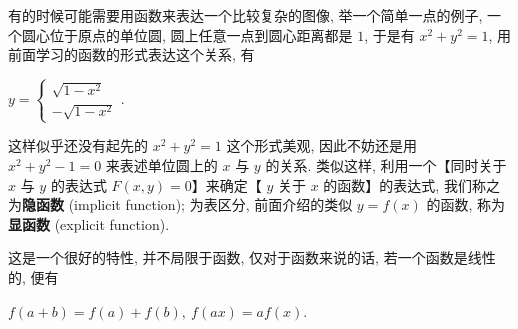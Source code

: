 \begin{tcolorbox}[size=fbox, breakable, enhanced jigsaw, title={隐函数 (implicit
function)}]

有的时候可能需要用函数来表达一个比较复杂的图像, 举一个简单一点的例子,
一个圆心位于原点的单位圆, 圆上任意一点到圆心距离都是 $1$, 于是有
$x^2+y^2=1$, 用前面学习的函数的形式表达这个关系, 有

$y=\begin{cases}\sqrt{1-x^2}\\-\sqrt{1-x^2}\end{cases}.$

这样似乎还没有起先的 $x^2+y^2=1$ 这个形式美观, 因此不妨还是用
$x^2+y^2-1=0$ 来表述单位圆上的 $x$ 与 $y$ 的关系. 类似这样,
利用一个【同时关于 $x$ 与 $y$ 的表达式 $F(x,y)=0$】来确定【 $y$
关于 $x$ 的函数】的表达式, 我们称之为\textbf{隐函数} (implicit
function); 为表区分, 前面介绍的类似 $y=f(x)$ 的函数,
称为\textbf{显函数} (explicit function).

\end{tcolorbox}

\begin{tcolorbox}[size=fbox, breakable, enhanced jigsaw, title={线性 (linearity)}]

这是一个很好的特性, 并不局限于函数, 仅对于函数来说的话,
若一个函数是线性的, 便有

$f(a+b)=f(a)+f(b),\ f(ax)=af(x).$

\end{tcolorbox}